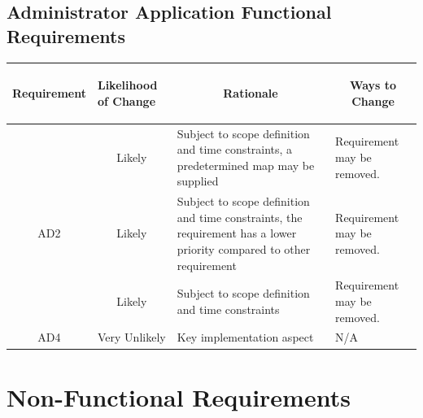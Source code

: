 \documentclass [11pt]{article}
\begin{document}
\pagebreak
\subsection{Administrator Application Functional Requirements}

\begin{longtable}{| p{ } | p{ } |  p{ } | p{ } |}\hline 
\multicolumn{1}{|c|}{\textbf {Requirement}} & 
\begin{minipage}{.14 \columnwidth}\begin{center}\vspace{1.5mm}\textbf{Likelihood of Change}   \vspace{1.5mm} \end{center}\end{minipage}& 
\multicolumn{1}{c|}{\textbf {Rationale}} & \multicolumn{1}{c|}{\textbf {Ways to Change}} \\ \hline

\rowcolor{tableCell} \multicolumn{1}{|c|}{AD1}& 
\multicolumn{1}{|c|}{Likely} & Subject to scope definition and time constraints, a predetermined map may be supplied & Requirement may be removed. \\ \hline

\multicolumn{1}{|c|}{AD2}& 
\multicolumn{1}{|c|}{Likely} & Subject to scope definition and time constraints, the requirement has a lower priority compared to other requirement & Requirement may be removed. \\ \hline

\rowcolor{tableCell} \multicolumn{1}{|c|}{AD3}& 
\multicolumn{1}{|c|}{Likely} & Subject to scope definition and time constraints & Requirement may be removed. \\ \hline

\multicolumn{1}{|c|}{AD4}& 
\multicolumn{1}{|c|}{Very Unlikely} & Key implementation aspect & N/A \\ \hline
\end{longtable}





\section {Non-Functional Requirements} 
\end{document}
